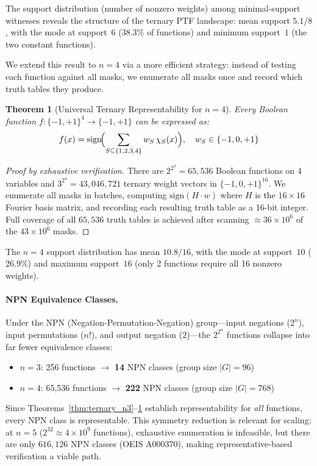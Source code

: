\documentclass[Royal,times,sageh]{sagej}
\newcommand{\sign}{\text{sign}}
\newtheorem{theorem}{Theorem}
\begin{document}
The support distribution (number of nonzero weights) among minimal-support witnesses reveals the structure of the ternary PTF landscape: mean support $5.1/8$, with the mode at support~$6$ (38.3\% of functions) and minimum support~$1$ (the two constant functions).

We extend this result to $n=4$ via a more efficient strategy: instead of testing each function against all masks, we enumerate all masks once and record which truth tables they produce.

\begin{theorem}[Universal Ternary Representability for $n=4$]
\label{thm:ternary_n4}
Every Boolean function $f: \{-1, +1\}^4 \to \{-1, +1\}$ can be expressed as:
\begin{equation}
    f(x) = \sign\!\Bigl(\sum_{S \subseteq \{1,2,3,4\}} w_S \,\chi_S(x)\Bigr), \quad w_S \in \{-1, 0, +1\}
\end{equation}
\end{theorem}

\begin{proof}[Proof by exhaustive verification]
There are $2^{2^4} = 65{,}536$ Boolean functions on 4 variables and $3^{2^4} = 43{,}046{,}721$ ternary weight vectors in $\{-1,0,+1\}^{16}$. We enumerate all masks in batches, computing $\sign(H \cdot w)$ where $H$ is the $16 \times 16$ Fourier basis matrix, and recording each resulting truth table as a 16-bit integer. Full coverage of all $65{,}536$ truth tables is achieved after scanning $\approx 36 \times 10^6$ of the $43 \times 10^6$ masks.
\end{proof}

The $n=4$ support distribution has mean $10.8/16$, with the mode at support~$10$ ($26.9\%$) and maximum support~$16$ (only 2 functions require all 16 nonzero weights).

\paragraph{NPN Equivalence Classes.}
Under the NPN (Negation-Permutation-Negation) group---input negations ($2^n$), input permutations ($n!$), and output negation ($2$)---the $2^{2^n}$ functions collapse into far fewer equivalence classes:
\begin{itemize}
    \item $n=3$: 256 functions $\to$ \textbf{14} NPN classes (group size $|G| = 96$)
    \item $n=4$: 65{,}536 functions $\to$ \textbf{222} NPN classes (group size $|G| = 768$)
\end{itemize}
Since Theorems~\ref{thm:ternary_n3}--\ref{thm:ternary_n4} establish representability for \emph{all} functions, every NPN class is representable. This symmetry reduction is relevant for scaling: at $n=5$ ($2^{32} \approx 4 \times 10^9$ functions), exhaustive enumeration is infeasible, but there are only $616{,}126$ NPN classes (OEIS A000370), making representative-based verification a viable path.
\end{document}

